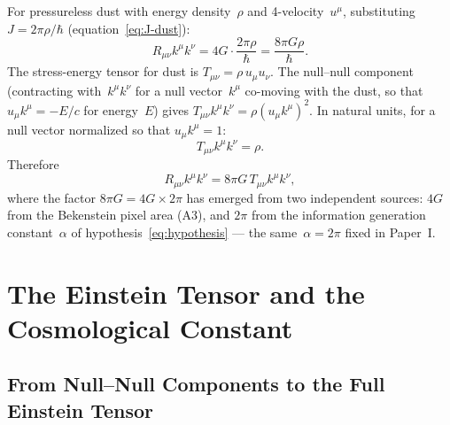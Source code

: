 \documentclass[12pt]{article}
\begin{document}
For pressureless dust with energy density~$\rho$ and
4-velocity~$u^\mu$, substituting
$J = 2\pi\rho/\hbar$ (equation~\eqref{eq:J-dust}):
\begin{equation}
  R_{\mu\nu}k^\mu k^\nu
  = 4G \cdot \frac{2\pi\rho}{\hbar}
  = \frac{8\pi G\rho}{\hbar}.
  \label{eq:ricci-dust}
\end{equation}
The stress-energy tensor for dust is
$T_{\mu\nu} = \rho\,u_\mu u_\nu$.
The null--null component (contracting with~$k^\mu k^\nu$ for
a null vector~$k^\mu$ co-moving with the dust, so that
$u_\mu k^\mu = -E/c$ for energy~$E$) gives
$T_{\mu\nu}k^\mu k^\nu = \rho(u_\mu k^\mu)^2$.
In natural units, for a null vector normalized so that
$u_\mu k^\mu = 1$:
\begin{equation}
  T_{\mu\nu}k^\mu k^\nu = \rho.
  \label{eq:tmunu-null}
\end{equation}
Therefore
\begin{equation}
  R_{\mu\nu}k^\mu k^\nu = 8\pi G\,T_{\mu\nu}k^\mu k^\nu,
  \label{eq:ricci-tmunu}
\end{equation}
where the factor $8\pi G = 4G \times 2\pi$ has emerged
from two independent sources: $4G$ from the Bekenstein
pixel area (A3), and $2\pi$ from the information generation
constant~$\alpha$ of hypothesis~\eqref{eq:hypothesis} ---
the same~$\alpha=2\pi$ fixed in Paper~I.

\section{The Einstein Tensor and the Cosmological Constant}
\label{sec:stress-energy}

\subsection{From Null--Null Components to the Full Einstein Tensor}
\end{document}

